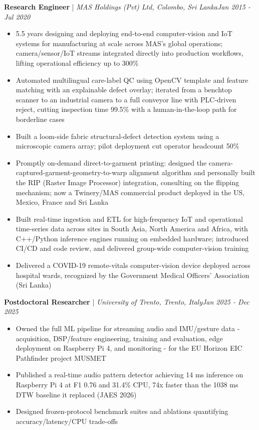 \documentclass[11pt]{article}
\newenvironment{cvrole}[5]{%
  \par\noindent\textbf{\large #1} | \textit{\small #2, #3}\hfill \textit{\small #4 - #5}\par
  \begin{itemize}[leftmargin=2em, itemsep=-0.3em, topsep=-0.5em]%
}{%
  \end{itemize}\par\noindent\mbox{}\par\vspace{0.1em}%
}
\begin{document}
\begin{cvrole}{Research Engineer}{MAS Holdings (Pvt) Ltd}{Colombo, Sri Lanka}{Jan 2015}{Jul 2020}
    \item 5.5 years designing and deploying end-to-end computer-vision and IoT systems for manufacturing at scale across MAS's global operations; camera/sensor/IoT streams integrated directly into production workflows, lifting operational efficiency up to 300\%
    \item Automated multilingual care-label QC using OpenCV template and feature matching with an explainable defect overlay; iterated from a benchtop scanner to an industrial camera to a full conveyor line with PLC-driven reject, cutting inspection time 99.5\% with a human-in-the-loop path for borderline cases
    \item Built a loom-side fabric structural-defect detection system using a microscopic camera array; pilot deployment cut operator headcount 50\%
    \item Promptly on-demand direct-to-garment printing: designed the camera-captured-garment-geometry-to-warp alignment algorithm and personally built the RIP (Raster Image Processor) integration, consulting on the flipping mechanism; now a Twinery/MAS commercial product deployed in the US, Mexico, France and Sri Lanka
    \item Built real-time ingestion and ETL for high-frequency IoT and operational time-series data across sites in South Asia, North America and Africa, with C++/Python inference engines running on embedded hardware; introduced CI/CD and code review, and delivered group-wide computer-vision training
    \item Delivered a COVID-19 remote-vitals computer-vision device deployed across hospital wards, recognized by the Government Medical Officers' Association (Sri Lanka)
\end{cvrole}

\begin{cvrole}{Postdoctoral Researcher}{University of Trento}{Trento, Italy}{Jan 2025}{Dec 2025}
    \item Owned the full ML pipeline for streaming audio and IMU/gesture data - acquisition, DSP/feature engineering, training and evaluation, edge deployment on Raspberry Pi 4, and monitoring - for the EU Horizon EIC Pathfinder project MUSMET
    \item Published a real-time audio pattern detector achieving 14 ms inference on Raspberry Pi 4 at F1 0.76 and 31.4\% CPU, 74x faster than the 1038 ms DTW baseline it replaced (JAES 2026)
    \item Designed frozen-protocol benchmark suites and ablations quantifying accuracy/latency/CPU trade-offs
\end{cvrole}
\end{document}
